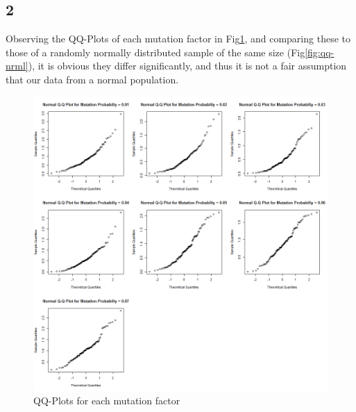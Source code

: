 \documentclass{article}
\begin{document}
    \subsection*{2}
    Observing the QQ-Plots of each mutation factor in Fig\ref{fig:qq-genal}, and comparing these to those of a randomly normally distributed sample of the same size (Fig\ref{fig:qq-nrml}), it is obvious they differ significantly, and thus it is not a fair assumption that our data from a normal population.
    
    \begin{figure}[H]
      \includegraphics[scale=0.4]{../results/3_2_1.png}
      \caption{QQ-Plots for each mutation factor}
      \label{fig:qq-genal}
    \end{figure}
    
\end{document}
